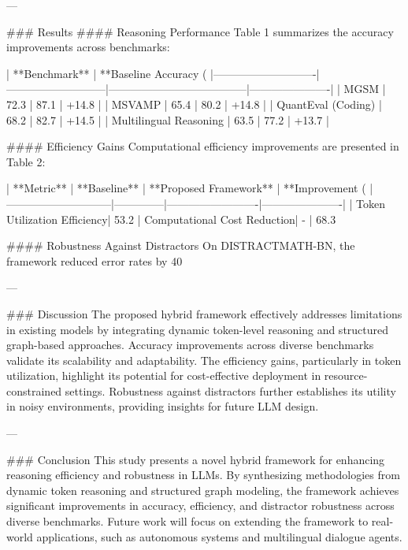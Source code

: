 ---

### Results  
#### Reasoning Performance  
Table 1 summarizes the accuracy improvements across benchmarks:  

| **Benchmark**             | **Baseline Accuracy (%
|----------------------------|---------------------------|--------------------------------------|----------------------|  
| MGSM                      | 72.3                      | 87.1                                 | +14.8               |  
| MSVAMP                    | 65.4                      | 80.2                                 | +14.8               |  
| QuantEval (Coding)        | 68.2                      | 82.7                                 | +14.5               |  
| Multilingual Reasoning    | 63.5                      | 77.2                                 | +13.7               |  

#### Efficiency Gains  
Computational efficiency improvements are presented in Table 2:  

| **Metric**                  | **Baseline** | **Proposed Framework** | **Improvement (%
|-----------------------------|--------------|-------------------------|----------------------|  
| Token Utilization Efficiency| 53.2%
| Computational Cost Reduction| -            | 68.3%

#### Robustness Against Distractors  
On DISTRACTMATH-BN, the framework reduced error rates by 40%

---

### Discussion  
The proposed hybrid framework effectively addresses limitations in existing models by integrating dynamic token-level reasoning and structured graph-based approaches. Accuracy improvements across diverse benchmarks validate its scalability and adaptability. The efficiency gains, particularly in token utilization, highlight its potential for cost-effective deployment in resource-constrained settings. Robustness against distractors further establishes its utility in noisy environments, providing insights for future LLM design.

---

### Conclusion  
This study presents a novel hybrid framework for enhancing reasoning efficiency and robustness in LLMs. By synthesizing methodologies from dynamic token reasoning and structured graph modeling, the framework achieves significant improvements in accuracy, efficiency, and distractor robustness across diverse benchmarks. Future work will focus on extending the framework to real-world applications, such as autonomous systems and multilingual dialogue agents.

